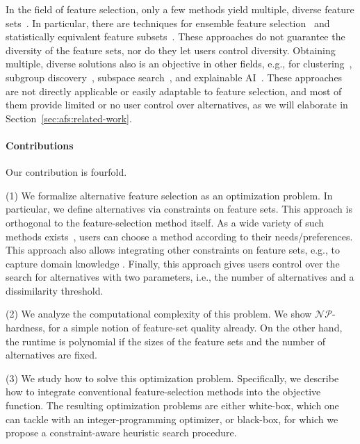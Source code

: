 \documentclass[iicol, sn-basic, Numbered]{sn-jnl} %
\theoremstyle{plain}
\theoremstyle{definition}
\begin{document}
In the field of feature selection, only a few methods yield multiple, diverse feature sets~\cite{borboudakis2021extending}.
In particular, there are techniques for ensemble feature selection~\cite{saeys2008robust, seijo2017ensemble} and statistically equivalent feature subsets~\cite{lagani2017feature}. 
These approaches do not guarantee the diversity of the feature sets, nor do they let users control diversity.
Obtaining multiple, diverse solutions also is an objective in other fields, e.g., for clustering~\cite{bailey2014alternative, hu2018subspace, mueller2009relevant}, subgroup discovery~\cite{leeuwen2012diverse}, subspace search~\cite{trittenbach2019dimension}, and explainable AI~\cite{artelt2022even, kim2016examples, russell2019efficient}.
These approaches are not directly applicable or easily adaptable to feature selection, and most of them provide limited or no user control over alternatives, as we will elaborate in Section~\ref{sec:afs:related-work}.

\paragraph{Contributions}

Our contribution is fourfold.

(1) We formalize alternative feature selection as an optimization problem.
In particular, we define alternatives via constraints on feature sets.
This approach is orthogonal to the feature-selection method itself. 
As a wide variety of such methods exists~\cite{chandrashekar2014survey, li2017feature}, users can choose a method according to their needs/preferences. 
This approach also allows integrating other constraints on feature sets, e.g., to capture domain knowledge \cite{bach2022empirical, groves2015toward}.
Finally, this approach gives users control over the search for alternatives with two parameters, i.e., the number of alternatives and a dissimilarity threshold. 

(2) We analyze the computational complexity of this problem.
We show $\mathcal{NP}$-hardness, for a simple notion of feature-set quality already. 
On the other hand, the runtime is polynomial if the sizes of the feature sets and the number of alternatives are fixed.

(3) We study how to solve this optimization problem. 
Specifically, we describe how to integrate conventional feature-selection methods into the objective function.
The resulting optimization problems are either white-box, which one can tackle with an integer-programming optimizer, or black-box, for which we propose a constraint-aware heuristic search procedure.
\end{document}
